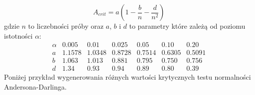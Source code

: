 \documentclass[polish,]{book}
\begin{document}
\begin{equation}
A_{crit}=a\left(1-\frac{b}{n}-\frac{d}{n^2}\right)
\label{eq:v09}
\end{equation}
gdzie \(n\) to liczebności próby oraz \(a\), \(b\) i \(d\) to parametry które zależą od poziomu istotności \(\alpha\):
\begin{equation}
\begin{array}{c|llllll}
  \alpha & 0.005 & 0.01 & 0.025 & 0.05 & 0.10 & 0.20\\
  \hline\hline
  a & 1.1578 & 1.0348 & 0.8728 & 0.7514 & 0.6305 & 0.5091\\
  b & 1.063 & 1.013 & 0.881 & 0.795 & 0.750 & 0.756\\
  d & 1.34 & 0.93 & 0.94 & 0.89 & 0.80 & 0.39
 \end{array}
\label{eq:v10}
\end{equation}
Poniżej przykład wygenerowania różnych wartości krytycznych testu normalności Andersona-Darlinga.
\end{document}
